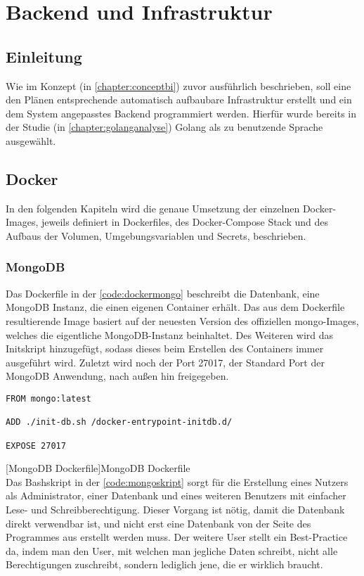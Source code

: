 
\section{Backend und Infrastruktur}

\subsection{Einleitung}
Wie im Konzept (in \autoref{chapter:conceptbi}) zuvor ausführlich beschrieben, soll eine den Plänen entsprechende automatisch aufbaubare Infrastruktur erstellt und ein dem System angepasstes Backend programmiert werden. Hierfür wurde bereits in der Studie (in \autoref{chapter:golanganalyse}) Golang als zu benutzende Sprache ausgewählt.
\subsection{Docker}

In den folgenden Kapiteln wird die genaue Umsetzung der einzelnen Docker-Images, jeweils definiert in Dockerfiles, des Docker-Compose Stack und des Aufbaus der Volumen, Umgebungsvariablen und Secrets, beschrieben.

\subsubsection{MongoDB}

Das Dockerfile in der \autoref{code:dockermongo} beschreibt die Datenbank, eine MongoDB Instanz, die einen eigenen Container erhält. Das aus dem Dockerfile resultierende Image basiert auf der neuesten Version des offiziellen mongo-Images, welches die eigentliche MongoDB-Instanz beinhaltet. Des Weiteren wird das Initskript hinzugefügt, sodass dieses beim Erstellen des Containers immer ausgeführt wird. Zuletzt wird noch der Port 27017, der Standard Port der MongoDB Anwendung, nach außen hin freigegeben.

\begin{verbatim}
FROM mongo:latest

ADD ./init-db.sh /docker-entrypoint-initdb.d/

EXPOSE 27017
\end{verbatim}
[MongoDB Dockerfile]{MongoDB Dockerfile}
\label{code:dockermongo}
~\\
Das Bashskript in der \autoref{code:mongoskript} sorgt für die Erstellung eines Nutzers als Administrator, einer Datenbank und eines weiteren Benutzers mit einfacher Lese- und Schreibberechtigung. Dieser Vorgang ist nötig, damit die Datenbank direkt verwendbar ist, und nicht erst eine Datenbank von der Seite des Programmes aus erstellt werden muss. Der weitere User stellt ein Best-Practice da, indem man den User, mit welchen man jegliche Daten schreibt, nicht alle Berechtigungen zuschreibt, sondern lediglich jene, die er wirklich braucht. 

